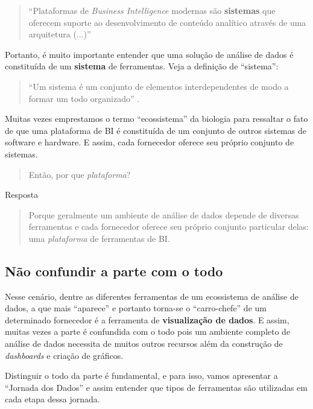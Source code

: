     \begin{quote}
        ``Plataformas de \emph{Business Intelligence} modernas são \large \textbf{sistemas} \normalsize que oferecem suporte ao desenvolvimento de conteúdo analítico através de uma arquitetura (...)'' 
    \end{quote}
    
     Portanto, é muito importante entender que uma solução de análise de dados é constituída de um \textbf{sistema} de ferramentas. Veja a definição de ``sistema'': 
    
    \begin{quote} 
     ``Um sistema é um conjunto de elementos interdependentes de modo a formar um todo organizado'' \cite{wikipedia:sistema}.
    \end{quote}
    
    Muitas vezes emprestamos o termo ``ecossistema'' da biologia para ressaltar o fato de que uma plataforma de BI é constituída de um conjunto de outros sistemas de software e hardware. E assim, cada fornecedor oferece seu próprio conjunto de sistemas.
    
    \begin{quote} 
        Então, por que \emph{plataforma}?
    \end{quote}
    
    \begin{env-destaque}{Resposta}
    \begin{quote}
        Porque geralmente um ambiente de análise de dados depende de diversas ferramentas e cada fornecedor oferece seu próprio conjunto particular delas: uma \emph{plataforma} de ferramentas de BI.
    \end{quote}
    \end{env-destaque}
    
    \subsection*{Não confundir a parte com o todo}
     
     Nesse cenário, dentre as diferentes ferramentas de um ecossistema de análise de dados, a que mais ``aparece'' e portanto 
     torna-se o ``carro-chefe'' de um determinado fornecedor é a ferramenta de \textbf{visualização de dados}.  E assim, muitas vezes a parte é confundida com o todo pois um ambiente completo de análise de dados necessita de muitos outros recursos além da construção de \emph{dashboards} e criação de gráficos.
     
     Distinguir o todo da parte é fundamental, e para isso, vamos apresentar a ``Jornada dos Dados'' e assim entender que tipos de ferramentas são utilizadas em cada etapa dessa jornada.
     
